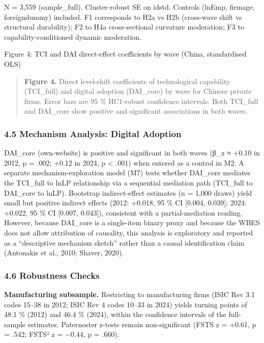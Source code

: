 \documentclass[
  12pt,a4paper]{article}
\begin{document}
N = 3,559 (sample\_full). Cluster-robust SE on idstd. Controls (lnEmp,
firmage, foreigndummy) included. F1 corresponds to H2a vs H2b
(cross-wave shift vs structural durability); F2 to H4a cross-sectional
curvature moderation; F3 to capability-conditioned dynamic moderation.

Figure 4: TCI and DAI direct-effect coefficients by wave (China,
standardised OLS)

\begin{quote}
\textbf{Figure 4.} Direct level‑shift coefficients of technological
capability (TCI\_full) and digital adoption (DAI\_core) by wave for
Chinese private firms. Error bars are 95 \% HC1-robust confidence
intervals. Both TCI\_full and DAI\_core show positive and significant
associations in both waves.
\end{quote}

\hypertarget{mechanism-analysis-digital-adoption}{%
\subsubsection{4.5 Mechanism Analysis: Digital
Adoption}\label{mechanism-analysis-digital-adoption}}

DAI\_core (own-website) is positive and significant in both waves (β\_z
≈ +0.10 in 2012, p = .002; +0.12 in 2024, p \textless{} .001) when
entered as a control in M2. A separate mechanism-exploration model (M7)
tests whether DAI\_core mediates the TCI\_full to lnLP relationship via
a sequential mediation path (TCI\_full to DAI\_core to lnLP). Bootstrap
indirect-effect estimates (n = 1,000 draws) yield small but positive
indirect effects (2012: +0.018, 95 \% CI {[}0.004, 0.039{]}; 2024:
+0.022, 95 \% CI {[}0.007, 0.043{]}), consistent with a
partial-mediation reading. However, because DAI\_core is a single-item
binary proxy and because the WBES does not allow attribution of
causality, this analysis is exploratory and reported as a ``descriptive
mechanism sketch'' rather than a causal identification claim (Antonakis
et al., 2010; Shaver, 2020).

\hypertarget{robustness-checks}{%
\subsubsection{4.6 Robustness Checks}\label{robustness-checks}}

\textbf{Manufacturing subsample.} Restricting to manufacturing firms
(ISIC Rev 3.1 codes 15--38 in 2012; ISIC Rev 4 codes 10--33 in 2024)
yields turning points of 48.1 \% (2012) and 46.4 \% (2024), within the
confidence intervals of the full-sample estimates. Paternoster z-tests
remain non-significant (FSTS z = +0.61, p = .542; FSTS² z = −0.44, p =
.660).
\end{document}
